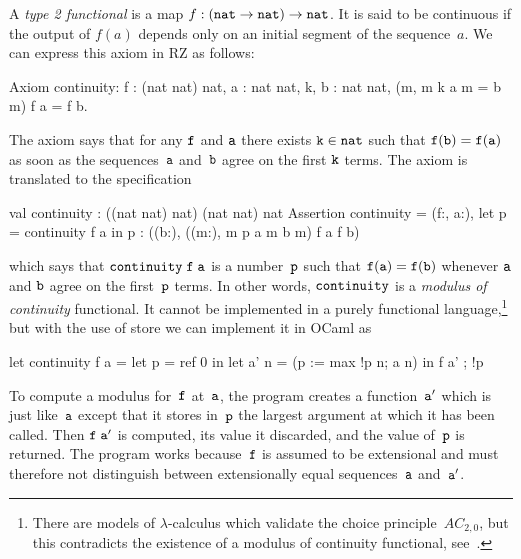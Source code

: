 A \emph{type 2 functional} is a map $f : (\mathtt{nat} \to \mathtt{nat})
\to \mathtt{nat}$. It is said to be continuous if the output of $f(a)$
depends only on an initial segment of the sequence~$a$. We can express
this axiom in RZ as follows:
%
\begin{source}
Axiom continuity: \iForall f : (nat \iTo nat) \iTo nat, \iForall a : nat \iTo nat,
  \iExists k, \iForall b : nat \iTo nat, (\iForall m, m \iLeq k \iTo a m = b m) \iTo f a = f b.
\end{source}
%
The axiom says that for any $\mathtt{f}$ and $\mathtt{a}$ there exists $\mathtt{k} \in
\mathtt{nat}$ such that $\mathtt{f(b) = f(a)}$ as soon as the sequences~$\mathtt{a}$
and~$\mathtt{b}$ agree on the first $\mathtt{k}$ terms. The axiom is translated to the
specification
%
\begin{source}
val continuity : ((nat \iTo nat) \iTo nat) \iTo (nat \iTo nat) \iTo nat
Assertion continuity =
  \iForall (f:, a:),
    let p = continuity f a in p :  \iAnd
    (\iForall (b:),
       (\iForall (m:),  m \iLeq p \iTo a m  b m) \iTo f a  f b)
\end{source}
%
which says that $\mathtt{continuity\;f\;a}$ is a number~$\mathtt{p}$ such that
$\mathtt{f(a) = f(b)}$ whenever $\mathtt{a}$ and $\mathtt{b}$ agree on the first~$\mathtt{p}$ terms. In
other words, $\mathtt{continuity}$ is a \emph{modulus of continuity}
functional. It cannot be implemented in a purely functional
language,\footnote{There are models of $\lambda$-calculus which validate
  the choice principle~$AC_{2,0}$, but this contradicts the
  existence of a modulus of continuity functional,
  see~\cite[9.6.10]{Troelstra:van-Dalen:88:2}.} but with the use of
store we can implement it in OCaml as
%
\begin{source}
let continuity f a =
  let p = ref 0 in
  let a' n = (p := max !p n; a n) in
    f a' ; !p
\end{source}
%
To compute a modulus for~$\mathtt{f}$ at~$\mathtt{a}$, the program creates a
function~$\mathtt{a'}$ which is just like~$\mathtt{a}$ except that it stores in~$\mathtt{p}$ the
largest argument at which it has been called. Then $\mathtt{f\;a'}$ is
computed, its value it discarded, and the value of~$\mathtt{p}$ is returned.
The program works because~$\mathtt{f}$ is assumed to be extensional and must
therefore not distinguish between extensionally equal sequences~$\mathtt{a}$
and~$\mathtt{a'}$.



